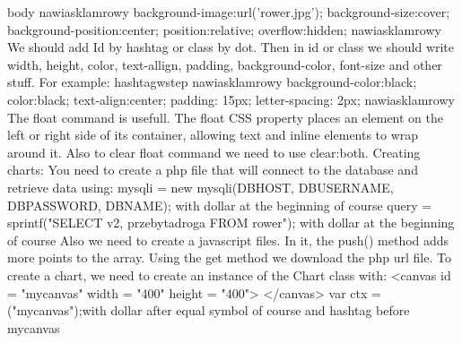 body\newline
nawiasklamrowy\newline
	background-image:url('rower.jpg');\newline
	background-size:cover;\newline
	background-position:center;\newline
	position:relative;\newline
	overflow:hidden;\newline
nawiasklamrowy\newline
\newline
We should add Id by hashtag or class by dot. Then in id or class we should write width, height, color, text-allign, padding, background-color, font-size and other stuff. For example:\newline
hashtagwstep\newline
nawiasklamrowy\newline
	background-color:black;\newline
	color:black;\newline
	text-align:center;\newline
	padding: 15px;\newline
	letter-spacing: 2px;\newline
nawiasklamrowy\newline
\newline
The float command is usefull. The float CSS property places an element on the left or right side of its container, allowing text and inline elements to wrap around it. \newline
Also to clear float command we need to use clear:both.\newline
Creating charts:\newline
You need to create a php file that will connect to the database and retrieve data using:\newline
mysqli = new mysqli(DBHOST, DBUSERNAME, DBPASSWORD, DBNAME); with dollar at the beginning of course\newline
query = sprintf("SELECT v2, przebytadroga FROM rower"); with dollar at the beginning of course\newline
\newline
\newline
Also we need to create a javascript files. In it, the push() method adds more points to the array. Using the get method we download the php url file.
To create a chart, we need to create an instance of the Chart class with:\newline
<canvas id = "mycanvas" width = "400" height = "400"> </canvas>\newline
var ctx =  ("mycanvas");with dollar after equal symbol of course and hashtag before mycanvas\newline


